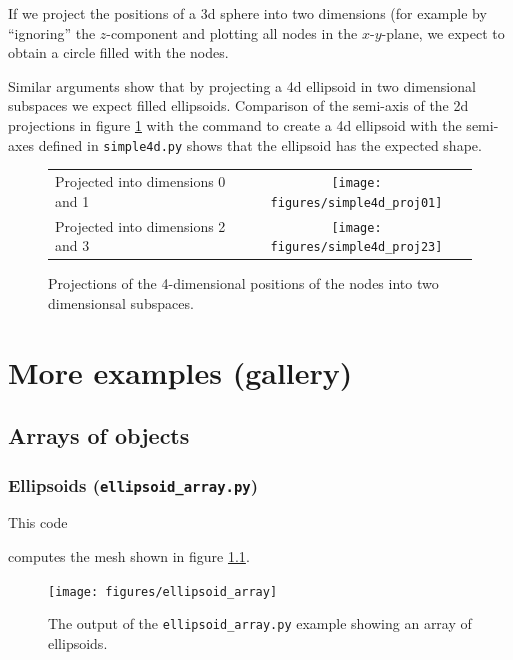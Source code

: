 \documentclass[10pt,a4paper]{book}
\newcommand{\py}[1]{\texttt{\color{blue}#1}}
\begin{document}
If we project the positions of a 3d sphere into two dimensions (for example by ``ignoring'' the $z$-component and plotting all nodes in the $x$-$y$-plane, we expect to obtain a circle filled with the nodes.

Similar arguments show that by projecting a 4d ellipsoid in two
dimensional subspaces we expect filled ellipsoids. Comparison of the
semi-axis of the 2d projections in figure \ref{fig:simple4d} with the
command to create a 4d ellipsoid with the semi-axes defined in
\texttt{simple4d.py} shows that the ellipsoid has the expected shape.

\begin{figure}[p]
\begin{tabular}{p{2cm}c}
\parbox{2cm}{Projected into dimensions 0 and 1}& \parbox{0.8\textwidth}{\texttt{[image: figures/simple4d\_proj01]}}\\
\parbox{2cm}{Projected into dimensions 2 and 3}& \parbox{0.8\textwidth}{\texttt{[image: figures/simple4d\_proj23]}}\\
\end{tabular}
\caption{\label{fig:simple4d} Projections of the 4-dimensional positions of the nodes into two dimensionsal subspaces.}
\end{figure}



\chapter{More  examples (gallery)}


\section{Arrays of objects}

\subsection{Ellipsoids (\texttt{ellipsoid\_array.py})}

This code 

computes the mesh shown in figure \ref{fig:ellipsoidarray}.
\begin{figure}[tbhp]
\centerline{\texttt{[image: figures/ellipsoid\_array]}}
\caption{\label{fig:ellipsoidarray} The output of the \py{ellipsoid\_array.py} example showing an array of ellipsoids.}
\end{figure}
\end{document}
